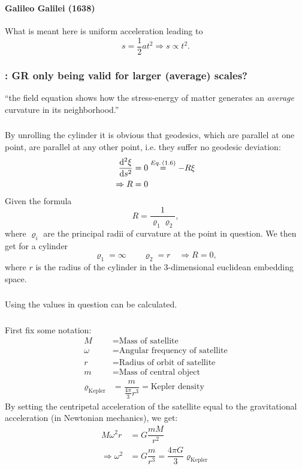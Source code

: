 \subsubsection{ }
\paragraph{Galileo Galilei (1638)}
What is meant here is uniform acceleration leading to
\[s=\dfrac{1}{2}a t^2 \Rightarrow s \propto t^2.\]

\subsubsection{\hint: GR only being valid for larger (average) scales? }
\enquote{the field equation shows how the stress-energy of matter generates an \emph{average} curvature in its neighborhood.}

\subsubsection{ }
By unrolling the cylinder it is obvious that geodesics, which are parallel at one point, are parallel at any other point, i.e. they suffer no geodesic deviation:
\begin{align*} 
	\derivative{^2\xi}{s^2}&=0\overset{\eq{1.6}}{=}-R\xi\\
	\Rightarrow R&=0
\end{align*}
Given the formula \[R=\dfrac{1}{\varrho_1\varrho_2},\]
where $\varrho_i$ are the principal radii of curvature at the point in question.
We then get for a cylinder \[\varrho_1=\infty\qquad\varrho_2=r \quad\Rightarrow R=0,\]
where $r$ is the radius of the cylinder in the 3-dimensional euclidean embedding space.
\subsubsection{ }
Using  the values in question can be calculated.

\subsubsection{ }
First fix some notation:
\begin{align*} 
	M&=\text{Mass of satellite}\\
	\omega&=\text{Angular frequency of satellite}\\
	r&=\text{Radius of orbit of satellite}\\
	m&=\text{Mass of central object}\\
	\varrho_{\text{Kepler}}&=\dfrac{m}{\frac{4\pi}{3}r^3}=\text{Kepler density}
\end{align*}
By setting the centripetal acceleration of the satellite equal to the gravitational acceleration (in Newtonian mechanics), we get:
\begin{align*} 
	M\omega^2 r&= G\dfrac{m M}{r^2}\\
	\Rightarrow \omega^2&=G\dfrac{m}{r^3}=\dfrac{4\pi G}{3}\varrho_{\text{Kepler}}
\end{align*}

